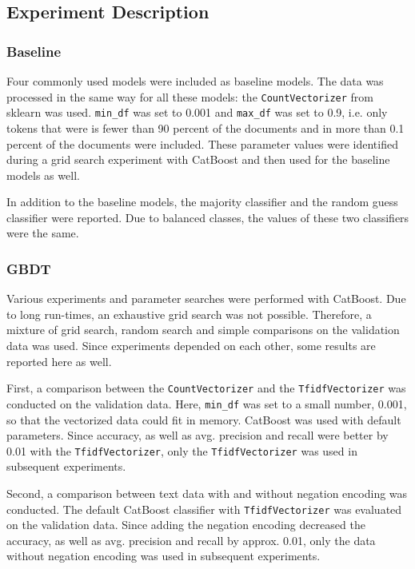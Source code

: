\documentclass{article}
\begin{document}
	\subsection{Experiment Description}
	
	\subsubsection{Baseline}
	
	Four commonly used models were included as baseline models. The data was processed in the same way for all these models: the \lstinline{CountVectorizer} from sklearn was used. \lstinline{min_df} was set to 0.001 and \lstinline{max_df} was set to 0.9, i.e. only tokens that were is fewer than 90 percent of the documents and in more than 0.1 percent of the documents were included. These parameter values were identified during a grid search experiment with CatBoost and then used for the baseline models as well.
	
	In addition to the baseline models, the majority classifier and the random guess classifier were reported. Due to balanced classes, the values of these two classifiers were the same.
	
	\subsubsection{GBDT}
	
	Various experiments and parameter searches were performed with CatBoost. Due to long run-times, an exhaustive grid search was not possible. Therefore, a mixture of grid search, random search and simple comparisons on the validation data was used. Since experiments depended on each other, some results are reported here as well.
	
	First, a comparison between the \lstinline{CountVectorizer} and the \lstinline{TfidfVectorizer} was conducted on the validation data. Here, \lstinline{min_df} was set to a small number, 0.001, so that the vectorized data could fit in memory. CatBoost was used with default parameters. Since accuracy, as well as avg. precision and recall were better by 0.01 with the \lstinline{TfidfVectorizer}, only the \lstinline{TfidfVectorizer} was used in subsequent experiments.
	
	Second, a comparison between text data with and without negation encoding was conducted. The default CatBoost classifier with \lstinline{TfidfVectorizer} was evaluated on the validation data. Since adding the negation encoding decreased the accuracy, as well as avg. precision and recall by approx. 0.01, only the data without negation encoding was used in subsequent experiments.
	
\end{document}
